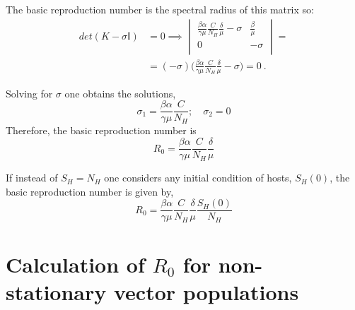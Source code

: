 The basic reproduction number is the spectral radius of this
matrix so:
\begin{equation*}
    \begin{aligned}
        det(K-\sigma\mathbb{I}) & = 0 \implies
        \begin{vmatrix}
            \frac{\beta \alpha}{\gamma
            \mu}\frac{C}{N_H}\frac{\delta}{\mu} -\sigma & \frac{\beta}{\mu } \\
            0                                           & -\sigma            \\
        \end{vmatrix} = \\
                                & = (-\sigma)\bigg(\frac{\beta
            \alpha}{\gamma
            \mu}\frac{C}{N_H}\frac{\delta}{\mu} -\sigma\bigg)  =0 \ .
    \end{aligned}
\end{equation*}

Solving for $\sigma$ one obtains the solutions,
\begin{equation}
    \sigma_1 = \frac{\beta \alpha}{\gamma
        \mu}\frac{C}{N_H}; \quad \sigma_2 = 0
\end{equation}
Therefore, the basic reproduction number is
\begin{equation}
    R_0 = \frac{\beta \alpha}{\gamma
        \mu}\frac{C}{N_H}\frac{\delta}{\mu}
\end{equation}

If instead of $S_H=N_H$ one considers any initial condition of hosts,
$S_H(0)$, the basic reproduction number is given by,
\begin{equation}
    R_0 = \frac{\beta \alpha}{\gamma
        \mu}\frac{C}{N_H}\frac{\delta}{\mu}\frac{S_H(0)}{N_H}
\end{equation}

\section{Calculation of $R_0$ for non-stationary vector populations}
\label{app:R0_non_stationary}

